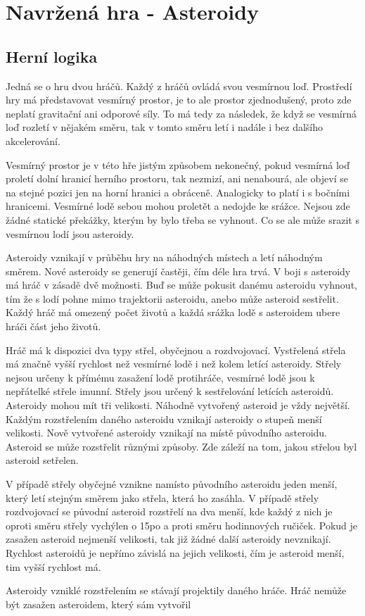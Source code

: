\chapter{Navržená hra - Asteroidy}

\section{Herní logika}
Jedná se o hru dvou hráčů. 
Každý z hráčů ovládá svou vesmírnou loď.
Prostředí hry má představovat vesmírný prostor, je to ale prostor zjednodušený, proto zde neplatí gravitační ani odporové síly.
To má tedy za následek, že když se vesmírná loď rozletí v nějakém směru, tak v tomto směru letí i nadále i bez dalšího akcelerování.
\par
Vesmírný prostor je v této hře jistým způsobem nekonečný, pokud vesmírná loď proletí dolní hranicí herního prostoru, tak nezmizí, ani nenabourá, ale objeví se na stejné pozici jen na horní hranici a obráceně. Analogicky to platí i s bočními hranicemi.
Vesmírné lodě sebou mohou proletět a nedojde ke srážce.
Nejsou zde žádné statické překážky, kterým by bylo třeba se vyhnout. Co se ale může srazit s vesmírnou lodí jsou asteroidy.    
\par
Asteroidy vznikají v průběhu hry na náhodných místech a letí náhodným směrem. Nové asteroidy se generují častěji, čím déle hra trvá.
V boji s asteroidy má hráč v zásadě dvě možnosti. Buď se může pokusit danému asteroidu vyhnout, tím že s lodí pohne mimo trajektorii asteroidu, anebo může asteroid sestřelit.
Každý hráč má omezený počet životů a každá srážka lodě s asteroidem ubere hráči část jeho životů.
\par
Hráč má k dispozici dva typy střel, obyčejnou a rozdvojovací. Vystřelená střela má značně vyšší rychlost než vesmírné lodě i než kolem letící asteroidy.
Střely nejsou určeny k přímému zasažení lodě protihráče, vesmírné lodě jsou k nepřátelké střele imunní.
Střely jsou určený k sestřelování letících asteroidů. Asteroidy mohou mít tři velikosti. Náhodně vytvořený asteroid je vždy největší. Každým rozstřelením daného asteroidu vznikají asteroidy o stupeň menší velikosti.
Nově vytvořené asteroidy vznikají na místě původního asteroidu. Asteroid se může rozstřelit různými způsoby. Zde záleží na tom, jakou střelou byl asteroid setřelen. 
\par
V případě střely obyčejné vznikne namísto původního asteroidu jeden menší, který letí stejným směrem jako střela, která ho zasáhla.
V případě střely rozdvojovací se původní asteroid rozstřelí na dva menší, kde každý z nich je oproti směru střely vychýlen o 15\textdegree po a proti směru hodinnových ručiček.
Pokud je zasažen asteroid nejmenší velikosti, tak již žádné další asteroidy nevznikají. 
Rychlost asteroidů je nepřímo závislá na jejich velikosti, čím je asteroid menší, tim vyšší rychlost má.
\par
Asteroidy vzniklé rozstřelením se stávají projektily daného hráče. Hráč nemůže být zasažen asteroidem, který sám vytvořil

